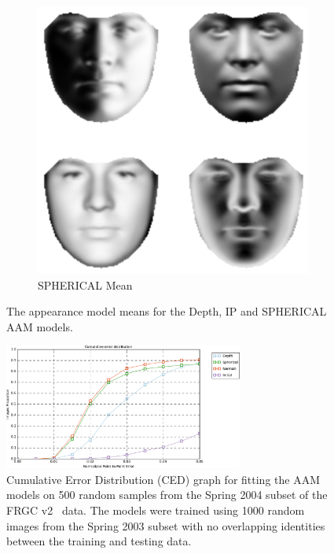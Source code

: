\begin{figure}[t]
\begin{subfigure}[b]{0.25\textwidth}
        \includegraphics[width=\textwidth]{statistical_normals/images/lk2d/spherical_aam_mean.png}
        \caption{SPHERICAL Mean}\label{subfig:singl_img_spherical_aam_mean}
    \end{subfigure}
    \hspace*{\fill}
    \caption{The appearance model means for the Depth, IP and SPHERICAL 
             AAM models.}
\label{fig:single_img_2d_aam_means}
\end{figure}
\begin{figure}[t]
    \centering
    \includegraphics[width=0.7\textwidth]{statistical_normals/images/lk2d/aam_fgrc_500_random.pdf}
    \caption{Cumulative Error Distribution (CED) graph for fitting the AAM
             models on 500 random samples from the Spring 2004 subset of the
             FRGC v2~\cite{phillips2005overview} data. The models were trained
             using 1000 random images from the Spring 2003 subset with no
             overlapping identities between the training and testing data.}
\label{fig:single_img_aam_results}
\end{figure}
